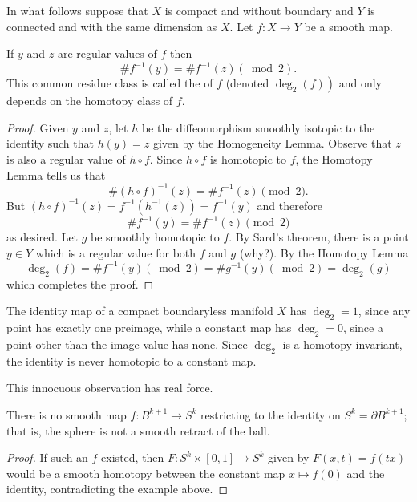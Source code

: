 \documentclass[a4paper]{scrartcl}
\begin{document}
In what follows suppose that $X$ is compact and without boundary and $Y$ is connected and with the same dimension as $X$. Let $f: X \rightarrow Y$ be a smooth map.

\begin{theorem}
    If $y$ and $z$ are regular values of $f$ then
    $$
    \# f^{-1}(y)=\# f^{-1}(z)(\bmod 2).
    $$
    This common residue class is called the  of $f$ (denoted $\left.\operatorname{deg}_{2}(f)\right)$ and only depends on the homotopy class of $f$.
\end{theorem}
\begin{proof}
    Given $y$ and $z$, let $h$ be the diffeomorphism smoothly isotopic to the identity such that $h(y)=z$ given by the Homogeneity Lemma. Observe that $z$ is also a regular value of $h \circ f$. Since $h \circ f$ is homotopic to $f$, the Homotopy Lemma tells us that
$$
\#(h \circ f)^{-1}(z)=\# f^{-1}(z) \pmod 2.
$$
But $(h \circ f)^{-1}(z)=f^{-1}\left(h^{-1}(z)\right)=f^{-1}(y)$ and therefore
$$
\# f^{-1}(y)=\# f^{-1}(z) \pmod 2
$$
as desired. Let $g$ be smoothly homotopic to $f$. By Sard's theorem, there is a point $y \in Y$ which is a regular value for both $f$ and $g$ (why?). By the Homotopy Lemma
$$
\operatorname{deg}_{2}(f)=\# f^{-1}(y)(\bmod 2)=\# g^{-1}(y)(\bmod 2)=\operatorname{deg}_{2}(g)
$$
which completes the proof. 
\end{proof}

\begin{example}
    The identity map of a compact boundaryless manifold $X$ has $\operatorname{deg}_2 = 1$, since any point has exactly one preimage, while a constant map has $\operatorname{deg}_2 = 0$, since a point other than the image value has none. Since $\deg_2$ is a homotopy invariant, the identity is never homotopic to a constant map.
\end{example}

This innocuous observation has real force.

\begin{corollary}\label{cor:noretraction}
    There is no smooth map $f: B^{k+1} \rightarrow S^{k}$ restricting to the identity on $S^k = \partial B^{k+1}$; that is, the sphere is not a smooth retract of the ball.
\end{corollary}
\begin{proof}
    If such an $f$ existed, then $F: S^{k}\times[0,1] \rightarrow S^{k}$ given by $F(x,t) = f(tx)$ would be a smooth homotopy between the constant map $x \mapsto f(0)$ and the identity, contradicting the example above.
\end{proof}
\end{document}
